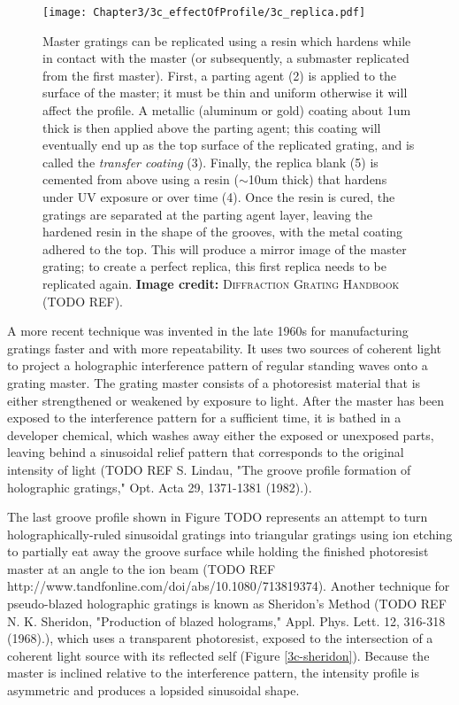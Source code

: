 \begin{figure}[htbp] %
   \centering
   \texttt{[image: Chapter3/3c\_effectOfProfile/3c\_replica.pdf]}
   \caption{Master gratings can be replicated using a resin which hardens while in contact with the master (or subsequently, a submaster replicated from the first master).  First, a parting agent (2) is applied to the surface of the master; it must be thin and uniform otherwise it will affect the profile.  A metallic (aluminum or gold) coating about 1um thick is then applied above the parting agent; this coating will eventually end up as the top surface of the replicated grating, and is called the \emph{transfer coating} (3).  Finally, the replica blank (5) is cemented from above using a resin ($\sim$10um thick) that hardens under UV exposure or over time (4).  Once the resin is cured, the gratings are separated at the parting agent layer, leaving the hardened resin in the shape of the grooves, with the metal coating adhered to the top.  This will produce a mirror image of the master grating; to create a perfect replica, this first replica needs to be replicated again.  \textbf{Image credit: }\textsc{Diffraction Grating Handbook} (TODO REF).}
   \label{3c-replication}
\end{figure}

A more recent technique was invented in the late 1960s for manufacturing gratings faster and with more repeatability.  It uses two sources of coherent light to project a  holographic interference pattern of regular standing waves onto a grating master.  The grating master consists of a photoresist material that is either strengthened or weakened by exposure to light.  After the master has been exposed to the interference pattern for a sufficient time, it is bathed in a developer chemical, which washes away either the exposed or unexposed parts, leaving behind a sinusoidal relief pattern that corresponds to the original intensity of light (TODO REF  S. Lindau, "The groove profile formation of holographic gratings," Opt. Acta 29, 1371-1381 (1982).).

The last groove profile shown in Figure TODO represents an attempt to turn holographically-ruled sinusoidal gratings into triangular gratings using ion etching to partially eat away the groove surface while holding the finished photoresist master at an angle to the ion beam (TODO REF http://www.tandfonline.com/doi/abs/10.1080/713819374).  Another technique for pseudo-blazed holographic gratings is known as Sheridon's Method (TODO REF N. K. Sheridon, "Production of blazed holograms," Appl. Phys. Lett. 12, 316-318 (1968).), which uses a transparent photoresist, exposed to the intersection of a coherent light source with its reflected self (Figure \ref{3c-sheridon}).  Because the master is inclined relative to the interference pattern, the intensity profile is asymmetric and produces a lopsided sinusoidal shape.

